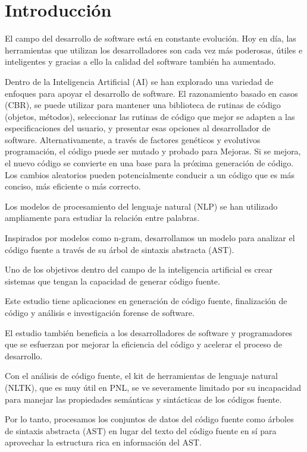 \section*{Introducción}
El campo del desarrollo de software está en constante evolución. 
Hoy en día, las herramientas que utilizan los desarrolladores 
son cada vez más poderosas, útiles e inteligentes 
y gracias a ello la calidad del software también ha aumentado.

Dentro de la Inteligencia Artificial (AI) se han explorado 
una variedad de enfoques para apoyar el desarrollo de software.
El razonamiento basado en casos (CBR), se puede utilizar para
mantener una biblioteca de rutinas de código (objetos, métodos),
seleccionar las rutinas de código 
que mejor se adapten a las especificaciones del usuario,
y presentar esas opciones al desarrollador de software.
Alternativamente, a través de factores genéticos y evolutivos
programación, el código puede ser mutado y probado para
Mejoras. Si se mejora, el nuevo código se convierte en una base
para la próxima generación de código. Los cambios aleatorios pueden
potencialmente conducir a un código que es más conciso, más
eficiente o más correcto. 

Los modelos de procesamiento del lenguaje natural (NLP) 
se han utilizado ampliamente para estudiar la relación entre palabras. 

Inspirados por modelos como n-gram, desarrollamos un modelo 
para analizar el código fuente a través de su árbol de sintaxis abstracta (AST). 

Uno de los objetivos dentro del campo de la inteligencia artificial 
es crear sistemas que tengan la capacidad de generar código fuente.

Este estudio tiene aplicaciones en generación de código fuente, 
finalización de código y análisis e investigación forense de software. 

El estudio también beneficia a los desarrolladores de software y programadores 
que se esfuerzan por mejorar la eficiencia del código 
y acelerar el proceso de desarrollo. 

Con el análisis de código fuente, 
el kit de herramientas de lenguaje natural (NLTK), 
que es muy útil en PNL, se ve severamente limitado 
por su incapacidad para manejar 
las propiedades semánticas y sintácticas de los códigos fuente. 

Por lo tanto, procesamos los conjuntos de datos del código fuente 
como árboles de sintaxis abstracta (AST) 
en lugar del texto del código fuente en sí 
para aprovechar la estructura rica en información del AST. 

